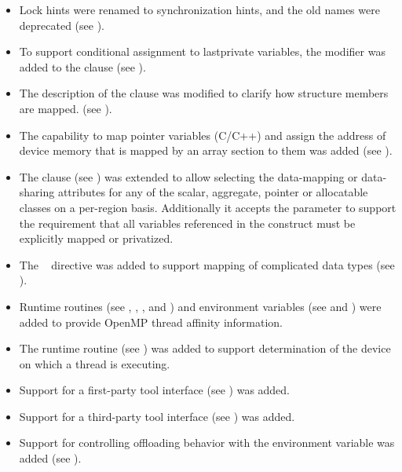 \begin{itemize}
\item Lock hints were renamed to synchronization hints, and the
      old names were deprecated (see ).

\item To support conditional assignment to lastprivate variables, the
       modifier was added to the 
      clause (see ).

\item The description of the  clause was modified to clarify how
      structure members are mapped. (see ).

\item The capability to map pointer variables (C/C++) and assign the
      address of device memory that is mapped by an array section to them
      was added (see ).

\item The  clause (see )
      was extended to allow selecting the data-mapping or data-sharing attributes for
      any of the scalar, aggregate, pointer or allocatable classes on a
      per-region basis. Additionally it accepts the  parameter to support the
      requirement that all variables referenced in the
      construct must be explicitly mapped or privatized.

\item The ~ directive was added to support
      mapping of complicated data types (see
      ).

\item Runtime routines (see ,
      ,
      , and
      ) and environment variables
      (see  and
      ) were added to provide OpenMP
      thread affinity information.

\item The  runtime routine
      (see ) was added to support
      determination of the device on which a thread is executing.

\item Support for a first-party tool interface (see
      ) was added.

\item Support for a third-party tool interface (see
      ) was added.

\item Support for controlling offloading behavior with the
       environment variable was added
      (see  ).      
      
\end{itemize}


